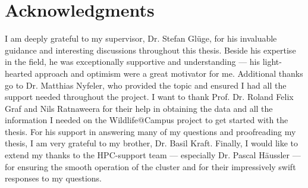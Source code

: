

\vspace*{\fill}

\section*{Acknowledgments}
\label{acknowledgments}

I am deeply grateful to my supervisor, Dr. Stefan Glüge, for his invaluable guidance and interesting discussions throughout this thesis.
Beside his expertise in the field, he was exceptionally supportive and understanding --- his light-hearted approach and optimism were a great motivator for me.
Additional thanks go to Dr. Matthias Nyfeler, who provided the topic and ensured I had all the support needed throughout the project.  
I want to thank Prof. Dr. Roland Felix Graf and Nils Ratnaweera for their help in obtaining the data and all the information I needed on the Wildlife@Campus project to get started with the thesis.
For his support in answering many of my questions and proofreading my thesis, I am very grateful to my brother, Dr. Basil Kraft.
Finally, I would like to extend my thanks to the HPC-support team --- especially Dr. Pascal Häussler --- for ensuring the smooth operation of the cluster and for their impressively swift responses to my questions.
\vspace*{\fill}
